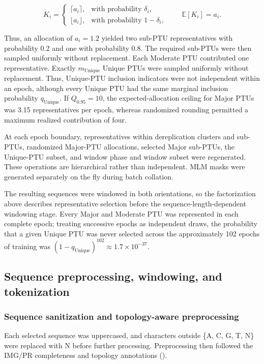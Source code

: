 \[
K_i=
\begin{cases}
\lceil a_i\rceil, & \text{with probability }\delta_i,\\
\lfloor a_i\rfloor, & \text{with probability }1-\delta_i,
\end{cases}
\qquad
\mathbb{E}[K_i]=a_i.
\]

Thus, an allocation of \(a_i=1.2\) yielded two sub-PTU representatives with
probability 0.2 and one with probability 0.8. The required sub-PTUs were then
sampled uniformly without replacement. Each Moderate PTU contributed one
representative. Exactly \(m_{\mathrm{Unique}}\) Unique PTUs were sampled
uniformly without replacement. Thus, Unique-PTU inclusion indicators were not
independent within an epoch, although every Unique PTU had the same marginal
inclusion probability \(q_{\mathrm{Unique}}\). If \(Q_{0.95}=10\), the
expected-allocation ceiling for Major PTUs was 3.15 representatives per epoch,
whereas randomized rounding permitted a maximum realized contribution of four.

At each epoch boundary, representatives within dereplication clusters and
sub-PTUs, randomized Major-PTU allocations, selected Major sub-PTUs, the
Unique-PTU subset, and window phase and window subset were regenerated. These
operations are hierarchical rather than independent. MLM masks were generated
separately on the fly during batch collation.

The resulting sequences were windowed in both orientations, so the
factorization above describes representative selection before the
sequence-length-dependent windowing stage. Every Major and Moderate PTU was
represented in each complete epoch; treating successive epochs as independent
draws, the probability that a given Unique PTU was never selected across the
approximately 102 epochs of training was \((1-q_{\mathrm{Unique}})^{102}\approx
1.7\times10^{-37}\).


\subsection*{Sequence preprocessing, windowing, and tokenization}

\subsubsection*{Sequence sanitization and topology-aware preprocessing}

Each selected sequence was uppercased, and characters outside \{A, C, G, T,
N\} were replaced with N before further processing. Preprocessing then
followed the IMG/PR completeness and topology annotations
().

